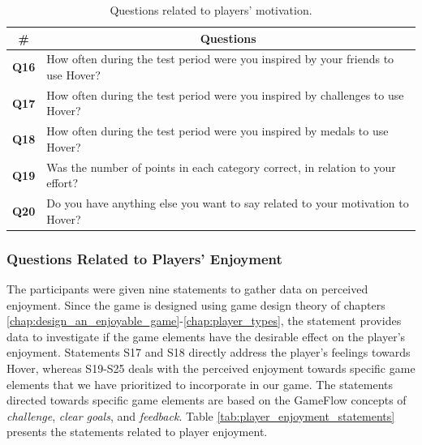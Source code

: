 \begin{table}[H]
    \centering
    \begin{tabularx}{\textwidth}{|c|X|}
        \hline
        \textbf{\#} & \multicolumn{1}{c|}{\textbf{Questions}} \\ \hline
        \textbf{Q16} & How often during the test period were you inspired by your friends to use Hover? \\
        \textbf{Q17} & How often during the test period were you inspired by challenges to use Hover? \\
        \textbf{Q18} & How often during the test period were you inspired by medals to use Hover? \\
        \textbf{Q19} & Was the number of points in each category correct, in relation to your effort? \\
        \textbf{Q20} & Do you have anything else you want to say related to your motivation to Hover? \\ \hline
    \end{tabularx}
    \caption{Questions related to players' motivation.}
    \label{tab:player_motivation_questions}
\end{table}

\subsubsection{Questions Related to Players' Enjoyment}
The participants were given nine statements to gather data on perceived enjoyment. Since the game is designed using game design theory of chapters \ref{chap:design_an_enjoyable_game}-\ref{chap:player_types}, the statement provides data to investigate if the game elements have the desirable effect on the player’s enjoyment. Statements S17 and S18 directly address the player’s feelings towards Hover, whereas S19-S25 deals with the perceived enjoyment towards specific game elements that we have prioritized to incorporate in our game. The statements directed towards specific game elements are based on the GameFlow concepts of \textit{challenge}, \textit{clear goals}, and \textit{feedback}. Table \ref{tab:player_enjoyment_statements} presents the statements related to player enjoyment.

